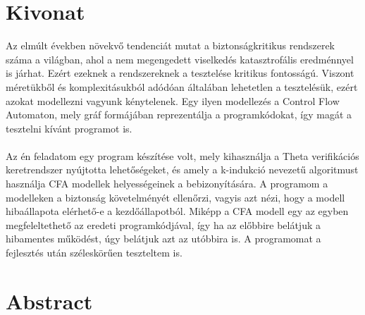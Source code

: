 \setcounter{page}{1}

\selecthungarian

\chapter*{Kivonat}

Az elmúlt években növekvő tendenciát mutat a biztonságkritikus rendszerek száma a világban, ahol a nem megengedett viselkedés katasztrofális eredménnyel is járhat. Ezért ezeknek a rendszereknek a tesztelése kritikus fontosságú. Viszont méretükből és komplexitásukból adódóan általában lehetetlen a tesztelésük, ezért azokat modellezni vagyunk kénytelenek. Egy ilyen modellezés a Control Flow Automaton, mely gráf formájában reprezentálja a programkódokat, így magát a tesztelni kívánt programot is.
\\
\\
Az én feladatom egy program készítése volt, mely kihasználja a Theta verifikációs keretrendszer nyújtotta lehetőségeket, és amely a k-indukció nevezetű algoritmust használja CFA modellek helyességeinek a bebizonyítására. A programom a modelleken a biztonság követelményét ellenőrzi, vagyis azt nézi, hogy a modell hibaállapota elérhető-e a kezdőállapotból. Miképp a CFA modell egy az egyben megfeleltethető az eredeti programkódjával, így ha az előbbire belátjuk a hibamentes működést, úgy belátjuk azt az utóbbira is. A programomat a fejlesztés után széleskörűen teszteltem is.

\vfill
\selectenglish


\chapter*{Abstract}


